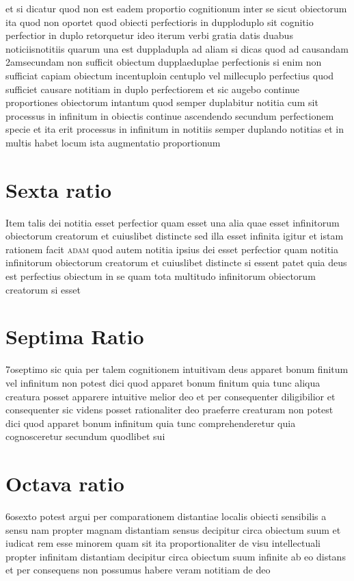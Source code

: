 \documentclass[twoside, openright]{report}
\newcommand{\name}[1]{\textsc{#1}}
\begin{document}
        \pstart
        et si dicatur quod non est eadem proportio cognitionum inter se sicut obiectorum ita quod non oportet quod obiecti perfectioris in dupploduplo sit cognitio perfectior in duplo retorquetur ideo iterum verbi gratia datis duabus noticiisnotitiis quarum una est duppladupla ad aliam si dicas quod ad causandam 2amsecundam non sufficit obiectum dupplaeduplae perfectionis si enim non sufficiat capiam obiectum incentuploin centuplo vel millecuplo perfectius quod sufficiet causare notitiam in duplo perfectiorem et sic augebo continue proportiones obiectorum intantum quod semper duplabitur notitia cum sit processus in infinitum in obiectis continue ascendendo secundum perfectionem specie et ita erit processus in infinitum in notitiis semper duplando notitias et in multis habet locum ista augmentatio proportionum
        \pend
      
        \bigskip
         \section*{Sexta ratio} 
        \pstart
        Item talis dei notitia esset perfectior quam esset una alia quae esset infinitorum obiectorum creatorum et cuiuslibet distincte sed illa esset infinita igitur et istam rationem facit \name{adam} quod autem notitia ipsius dei esset perfectior quam notitia infinitorum obiectorum creatorum et cuiuslibet distincte si essent patet quia deus est perfectius obiectum in se quam tota multitudo infinitorum obiectorum creatorum si esset
        \pend
      
        \bigskip
         \section*{Septima Ratio} 
        \pstart
        7oseptimo sic quia per talem cognitionem intuitivam deus apparet bonum finitum vel infinitum non potest dici quod apparet bonum finitum quia tunc aliqua creatura posset apparere intuitive melior deo et per consequenter diligibilior et consequenter sic videns posset rationaliter deo praeferre creaturam non potest dici quod apparet bonum infinitum quia tunc comprehenderetur quia cognosceretur secundum quodlibet sui
        \pend
      
        \bigskip
         \section*{Octava ratio} 
        \pstart
        6osexto potest argui per comparationem distantiae localis obiecti sensibilis a sensu nam propter magnam distantiam sensus decipitur circa obiectum suum et iudicat rem esse minorem quam sit ita proportionaliter de visu intellectuali propter infinitam distantiam decipitur circa obiectum suum infinite ab eo distans et per consequens non possumus habere veram notitiam de deo
        \pend
     
\end{document}

